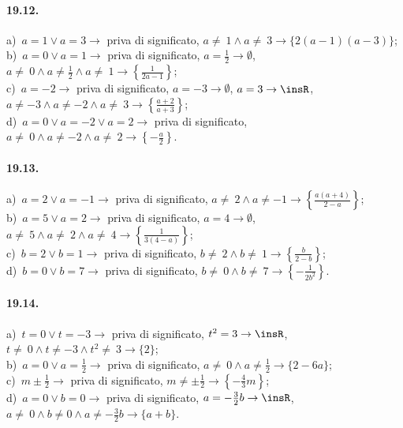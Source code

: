 \paragraph{19.12.}
a)~$a=1\vee a=3 \rightarrow$ priva di significato, $a\neq~1\wedge a\neq~3 \rightarrow \{2(a-1)(a-3)\}$;
\protect\\ b)~$a=0\vee a=1 \rightarrow$ priva di significato, $a=\frac{1}{2} \rightarrow \emptyset$, $a\neq~0\wedge a\neq \frac{1}{2}\wedge a\neq~1 \rightarrow \left\{\frac{1}{2a-1}\right\}$;
\protect\\ c)~$a=-2 \rightarrow$ priva di significato, $a=-3 \rightarrow \emptyset$, $a=3 \rightarrow \insR$, $a\neq -3\wedge a\neq -2\wedge a\neq~3 \rightarrow \left\{\frac{a+2}{a+3}\right\}$;
\protect\\ d)~$a=0\vee a=-2\vee a=2 \rightarrow$ priva di significato, $a\neq~0\wedge a\neq -2\wedge a\neq~2 \rightarrow \left\{-{\frac{a}{2}}\right\}$.

\paragraph{19.13.}
a)~$a=2\vee a=-1 \rightarrow$ priva di significato, $a\neq~2\wedge a\neq -1 \rightarrow \left\{\frac{a(a+4)}{2-a}\right\}$;
\protect\\ b)~$a=5\vee a=2 \rightarrow$ priva di significato, $a=4 \rightarrow \emptyset$, $a\neq~5\wedge a\neq~2\wedge a\neq~4 \rightarrow \left\{\frac{1}{3(4-a)}\right\}$;
\protect\\ c)~$b=2\vee b=1 \rightarrow$ priva di significato, $b\neq~2\wedge b\neq~1 \rightarrow \left\{\frac{b}{2-b}\right\}$;
\protect\\ d)~$b=0\vee b=7\rightarrow$ priva di significato, $b\neq~0\wedge b\neq~7 \rightarrow \left\{-{\frac{1}{2b^{2}}}\right\}$.

\paragraph{19.14.}
a)~$t=0\vee t=-3 \rightarrow$ priva di significato, $t^{2}=3 \rightarrow \insR$, $t\neq~0\wedge t\neq -3\wedge t^{2}\neq~3 \rightarrow \{2\}$;
\protect\\ b)~$a=0\vee a=\frac{1}{2} \rightarrow$ priva di significato, $a\neq~0\wedge a\neq \frac{1}{2} \rightarrow \{2-6a\}$;
\protect\\ c)~$m\pm\frac{1}{2} \rightarrow$ priva di significato, $m\neq \pm\frac{1}{2} \rightarrow \left\{-{\frac{4}{3}}m\right\}$;
\protect\\ d)~$a=0\vee b=0 \rightarrow$ priva di significato, $a=-\frac{3}{2}b\rightarrow \insR$, $a\neq~0\wedge b\neq 0\wedge a\neq-\frac{3}{2}b \rightarrow \{a+b\}$.

